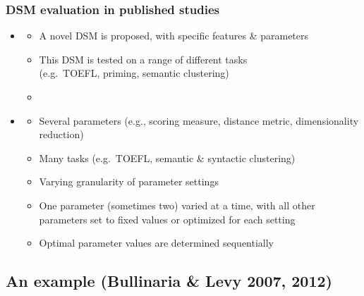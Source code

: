 \documentclass[t]{beamer} %
\begin{document}
\begin{frame}
  \frametitle{DSM evaluation in published studies}

  \begin{itemize}
  \item {} \citep{Pado:Lapata:07,Baroni:Lenci:10,Pennington:Socher:Manning:14}
    \begin{itemize}
    \item A novel DSM is proposed, with specific features \& parameters
    \item This DSM is tested on a range of different tasks\\ (e.g.\ TOEFL, priming, semantic clustering)
    \item[]
    \end{itemize}

  \item<2->  \citep{Bullinaria:Levy:07,Bullinaria:Levy:12,Kiela:Clark:14,Polajnar:Clark:14}
    \begin{itemize}
    \item Several parameters (e.g., scoring measure, distance metric, dimensionality reduction) 
    \item Many tasks (e.g.\ TOEFL, semantic \& syntactic clustering)
    \item Varying granularity of parameter settings
    \item One parameter (sometimes two) varied at a time, with all other parameters set to fixed values or optimized for each setting
    \item Optimal parameter values are determined sequentially
    \end{itemize}

  \end{itemize}
\end{frame}



\subsection{An example (Bullinaria \& Levy 2007, 2012)}
\end{document}
